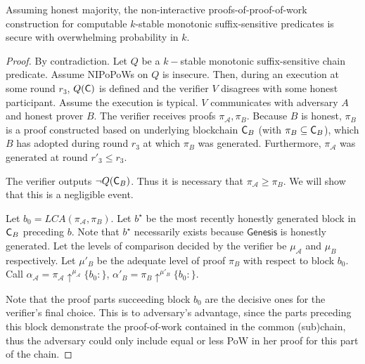 \begin{thm}
	Assuming honest majority, the non-interactive
	proofs-of-proof-of-work construction for computable $k$-stable monotonic
	suffix-sensitive predicates is secure with overwhelming probability in $k$.
	\label{thm:suffix_security_soft_fork}
\end{thm}
\begin{proof}
	By contradiction. Let $Q$ be a $k-$stable monotonic
	suffix-sensitive chain predicate. Assume NIPoPoWs on $Q$ is insecure. Then,
	during an execution at some round  $r_3$, $Q(\mathsf{C})$ is defined and the verifier
	$V$ disagrees with some honest participant. Assume the execution is typical.
	$V$ communicates with adversary $A$ and honest prover $B$. The verifier receives
	proofs $\pi_\mathcal{A}, \pi_B$. Because $B$ is honest, $\pi_B$ is a proof constructed
	based on underlying blockchain $\mathsf{C}_B$ (with $\pi_B \subseteq \mathsf{C}_B$), which $B$
	has adopted during round $r_3$ at which $\pi_B$ was generated. Furthermore,
	$\pi_\mathcal{A}$ was generated at round $r'_3 \leq r_3$.

	The verifier outputs $\neg Q(\mathsf{C}_B)$. Thus it is necessary that $\pi_\mathcal{A} \geq 
	\pi_B$. We will show that this is a negligible event.

	Let $b_0 = LCA(\pi_\mathcal{A}, \pi_B)$. 
	Let $b^\star$ be the most recently honestly generated block in $\mathsf{C}_B$ preceding $b$. Note that $b^\star$ necessarily exists because $\mathsf{Genesis}$ is honestly generated. 
	Let the levels of comparison
	decided by the verifier be $\mu_\mathcal{A}$ and $\mu_B$ respectively. Let $\mu'_B$
	be the adequate level of proof $\pi_B$  with respect to block $b_0$. Call
	$\alpha_\mathcal{A} = \pi_\mathcal{A} \uparrow^{\mu_\mathcal{A}}\{b_0:\}$,
	$\alpha'_B = \pi_B \uparrow^{\mu'_B}\{b_0:\}$.

	Note that the  proof parts succeeding block $b_0$ are the decisive ones 
	for the verifier's final choice. This is to adversary's advantage, since the parts 
	preceding this block demonstrate the proof-of-work contained in the common 
	(sub)chain, thus the adversary could only include equal or less PoW
	in her proof for this part of the chain.



\end{proof}
